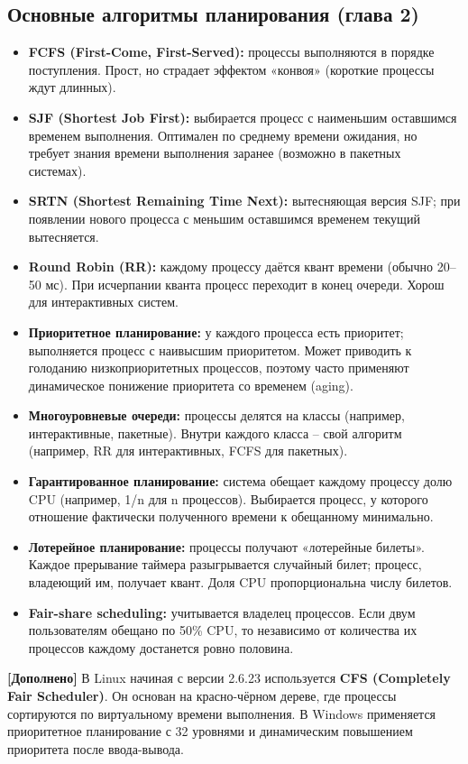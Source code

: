 \documentclass[a4paper,12pt]{article}
\begin{document}
\subsection{Основные алгоритмы планирования (глава 2)}
\begin{itemize}
    \item \textbf{FCFS (First-Come, First-Served):} процессы выполняются в порядке поступления. Прост, но страдает эффектом «конвоя» (короткие процессы ждут длинных).
    \item \textbf{SJF (Shortest Job First):} выбирается процесс с наименьшим оставшимся временем выполнения. Оптимален по среднему времени ожидания, но требует знания времени выполнения заранее (возможно в пакетных системах).
    \item \textbf{SRTN (Shortest Remaining Time Next):} вытесняющая версия SJF; при появлении нового процесса с меньшим оставшимся временем текущий вытесняется.
    \item \textbf{Round Robin (RR):} каждому процессу даётся квант времени (обычно 20–50 мс). При исчерпании кванта процесс переходит в конец очереди. Хорош для интерактивных систем.
    \item \textbf{Приоритетное планирование:} у каждого процесса есть приоритет; выполняется процесс с наивысшим приоритетом. Может приводить к голоданию низкоприоритетных процессов, поэтому часто применяют динамическое понижение приоритета со временем (aging).
    \item \textbf{Многоуровневые очереди:} процессы делятся на классы (например, интерактивные, пакетные). Внутри каждого класса – свой алгоритм (например, RR для интерактивных, FCFS для пакетных).
    \item \textbf{Гарантированное планирование:} система обещает каждому процессу долю CPU (например, 1/n для n процессов). Выбирается процесс, у которого отношение фактически полученного времени к обещанному минимально.
    \item \textbf{Лотерейное планирование:} процессы получают «лотерейные билеты». Каждое прерывание таймера разыгрывается случайный билет; процесс, владеющий им, получает квант. Доля CPU пропорциональна числу билетов.
    \item \textbf{Fair-share scheduling:} учитывается владелец процессов. Если двум пользователям обещано по 50\% CPU, то независимо от количества их процессов каждому достанется ровно половина.
\end{itemize}
\textbf{[Дополнено]} В Linux начиная с версии 2.6.23 используется \textbf{CFS (Completely Fair Scheduler)}. Он основан на красно-чёрном дереве, где процессы сортируются по виртуальному времени выполнения. В Windows применяется приоритетное планирование с 32 уровнями и динамическим повышением приоритета после ввода-вывода.
\end{document}
